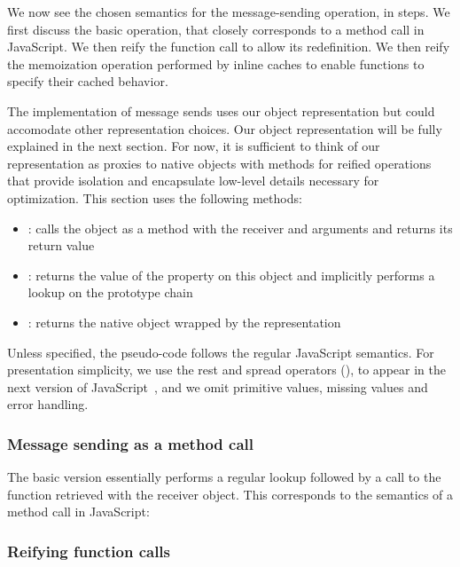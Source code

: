 We now see the chosen semantics for the message-sending operation, in steps. We
first discuss the basic operation, that closely corresponds to a method call in
JavaScript. We  then reify the function call to allow its redefinition. We then
reify the memoization operation performed by inline caches to enable functions
to specify their cached behavior. 

The implementation of message sends uses our object representation but could
accomodate other representation choices. Our object representation will be
fully explained in the next section. For now, it is sufficient to think of our
representation as proxies to native objects with methods for reified operations
that provide isolation and encapsulate low-level details necessary for
optimization. This section uses the following methods:
\begin{itemize}
    \item {}: calls the object as a method with the
     receiver and  arguments and returns its return value
    \item {}: returns the value of the  property on
    this object and implicitly performs a lookup on the prototype chain
    \item {}: returns the native object wrapped by the representation 
\end{itemize}

Unless specified, the pseudo-code follows the regular JavaScript semantics.
For presentation simplicity, we use the rest and spread operators
(), to appear in the next version of JavaScript~\cite{ECMAScript6},
and  we omit primitive values, missing values and error handling.

\subsubsection{Message sending as a method call}

The basic version essentially performs a regular lookup followed by a call to
the function retrieved with the receiver object. This corresponds to the
semantics of a method call in JavaScript:



\subsubsection{Reifying function calls}
\label{sec:AugmentedFunctionCalling}

